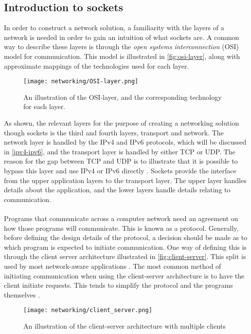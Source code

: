 \subsection{Introduction to sockets}
In order to construct a network solution, a familiarity with the layers of a network is needed in order to gain an intuition of what sockets are.
A common way to describe these layers is through the \textit{open systems interconnection} (OSI) model for communication.
This model is illustrated in \autoref{fig:osi-layer}, along with approximate mappings of the technologies used for each layer.
\begin{figure}[H]
    \centering
    \texttt{[image: networking/OSI-layer.png]}
    \caption{An illustration of the OSI-layer, and the corresponding technology for each layer.}
    \label{fig:osi-layer}
\end{figure}
\noindent
As shown, the relevant layers for the purpose of creating a networking solution though sockets is the third and fourth layers, transport and network.
The network layer is handled by the IPv4 and IPv6 protocols, which will be discussed in \autoref{ipv4-ipv6}, and the transport layer is handled by either TCP or UDP.
The reason for the gap between TCP and UDP is to illustrate that it is possible to bypass this layer and use IPv4 or IPv6 directly \cite{socketnetworking}.
Sockets provide the interface from the upper application layers to the transport layer.
The upper layer handles details about the application, and the lower layers handle details relating to communication.
\\\\
Programs that communicate across a computer network need an agreement on how those programs will communicate.
This is known as a protocol.
Generally, before defining the design details of the protocol, a decision should be made as to which program is expected to initiate communication.
One way of defining this is through the client server architecture illustrated in \autoref{fig:client-server}.
This split is used by most network-aware applications \cite{socketnetworking}.
The most common method of initiating communication when using the client-server architecture is to have the client initiate requests.
This tends to simplify the protocol and the programs themselves \cite{socketnetworking}.

\begin{figure}[H]
    \centering
    \texttt{[image: networking/client\_server.png]}
    \caption{An illustration of the client-server architecture with multiple clients}
    \label{fig:client-server}
\end{figure}


